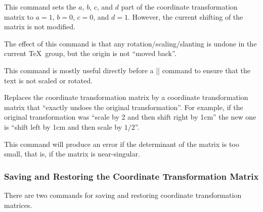 \begin{command}{\pgftransformresetnontranslations}
    This command sets the $a$, $b$, $c$, and $d$ part of the coordinate
    transformation matrix to $a=1$, $b=0$, $c=0$, and $d=1$. However, the
    current shifting of the matrix is not modified.

    The effect of this command is that any rotation/scaling/slanting is undone
    in the current \TeX\ group, but the origin is not ``moved back''.

    This command is mostly useful directly before a |\pgftext| command to
    ensure that the text is not scaled or rotated.
\begin{codeexample}[]
\end{codeexample}
\end{command}

\begin{command}{\pgftransforminvert}
    Replaces the coordinate transformation matrix by a coordinate
    transformation matrix that ``exactly undoes the original transformation''.
    For example, if the original transformation was ``scale by 2 and then shift
    right by 1cm'' the new one is ``shift left by 1cm and then scale by
    $1/2$''.

    This command will produce an error if the determinant of the matrix is too
    small, that is, if the matrix is near-singular.
\begin{codeexample}[]
\end{codeexample}
\end{command}


\subsubsection{Saving and Restoring the Coordinate Transformation Matrix}

There are two commands for saving and restoring coordinate transformation
matrices.

